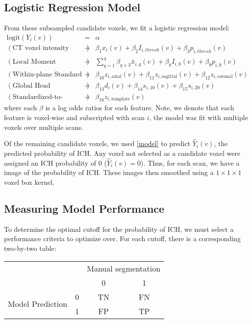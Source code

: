 \documentclass[12pt]{report}
\begin{document}
\begin{refsection}
\subsection{Logistic Regression Model}
From these subsampled candidate voxels, we fit a logistic regression model:
\begin{eqnarray}
\mbox{logit}(Y_i(v)) &=& \alpha \\ \nonumber
(\text{CT voxel intensity information})\;\;\;\;\;\;\;\; &+& \beta_1 x_{i}(v) + \beta_2 I_{i,thresh}(v) + \beta_3 p_{i,thresh}(v)  \\ \nonumber
(\text{Local Moment Information})\;\;\;\;\;\;\;\; &+& \sum_{q=1}^{4} \beta_{q+3} \bar{x}_{i,q}(v) + \beta_8 I_{i, 0}(v) + \beta_9 p_{i, 0}(v) \\ \nonumber
(\text{Within-plane Standard Scores})\;\;\;\;\;\;\;\; &+& \beta_{10} z_{i,\text{axial}}(v) + \beta_{11} z_{i,\text{sagittal}}(v) + \beta_{12} z_{i,\text{coronal}}(v) \\ \nonumber
(\text{Global Head Information})\;\;\;\;\;\;\;\; &+& \beta_{13} d_{i}(v) + \beta_{14} s_{i, 10}(v) + \beta_{15} s_{i, 20}(v) \\ \nonumber
(\text{Standardized-to-template Intensity})\;\;\;\;\;\;\;\; &+& \beta_{16} z_{i, \text{template}}(v) \label{model}
\end{eqnarray}
where each $\beta$ is a log odds ratios for each feature.  Note, we denote that each feature is voxel-wise and subscripted with scan $i$, the model was fit with multiple voxels over multiple scans.  

Of the remaining candidate voxels, we used \eqref{model} to predict $\hat{Y}_{i}(v)$, the predicted probability of ICH.  Any voxel not selected as a candidate voxel were assigned an ICH probability of $0$ ($\hat{Y}_{i}(v) = 0$).  Thus, for each scan, we have a image of the probability of ICH.  These images then smoothed using a $1\times 1 \times 1$ voxel box kernel.  

\subsection{Measuring Model Performance}
To determine the optimal cutoff for the probability of ICH, we must select a performance criteria to optimize over.  For each cutoff, there is a corresponding two-by-two table:

\begin{table}[H]
\begin{tabular}{c|c|c|c}
\multicolumn{1}{c}{} &\multicolumn{1}{c}{} & \multicolumn{2}{c}{Manual segmentation}\\ \cline{2-4}
& & 0 & \multicolumn{1}{c|}{1} \\ \cline{2-4}
\multirow{2}{*}{Model Prediction} & 0 & TN & \multicolumn{1}{c|}{FN} \\ \cline{2-4}
& 1 & FP & \multicolumn{1}{c|}{TP} \\ \cline{2-4}
\end{tabular}
\end{table}


\end{refsection}
\end{document}
